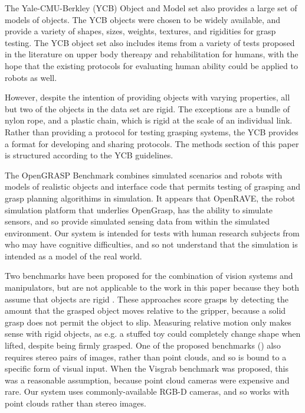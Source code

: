 \documentclass[letterpaper, 10 pt, conference]{ieeeconf}
\begin{document}
The Yale-CMU-Berkley (YCB) Object and Model set \cite{DBLP:journals/corr/CalliWSSAD15} also provides a large set of models of objects. 
The YCB objects were chosen to be widely available, and provide a variety of shapes, sizes, weights, textures, and rigidities for grasp testing. 
The YCB object set also includes items from a variety of tests proposed in the literature on upper body thereapy and rehabilitation for humans, with the hope that the existing protocols for evaluating human ability could be applied to robots as well. 

However, despite the intention of providing objects with varying properties, all but two of the objects in the data set are rigid. 
The exceptions are a bundle of nylon rope, and a plastic chain, which is rigid at the scale of an individual link. 
Rather than providing a protocol for testing grasping systems, the YCB provides a format for developing and sharing protocols. 
The methods section of this paper is structured according to the YCB guidelines. 

The OpenGRASP Benchmark \cite{ulbrich2011opengrasp} combines simulated scenarios and robots with models of realistic objects and interface code that permits testing of grasping and grasp planning algorithims in simulation. 
It appears that OpenRAVE, the robot simulation platform that underlies OpenGrasp, has the ability to simulate sensors, and so provide simulated sensing data from within the simulated environment.
Our system is intended for tests with human research subjects from who may have cognitive difficulties, and so not understand that the simulation is intended as a model of the real world. 

Two benchmarks have been proposed for the combination of vision systems and manipulators, but are not applicable to the work in this paper because they both assume that objects are rigid \cite{popovic2011grasping, kootstra2012visgrab}. 
These approaches score grasps by detecting the amount that the grasped object moves relative to the gripper, because a solid grasp does not permit the object to slip. 
Measuring relative motion only makes sense with rigid objects, as e.g. a stuffed toy could completely change shape when lifted, despite being firmly grasped.
One of the proposed benchmarks (\cite{kootstra2012visgrab}) also requires stereo pairs of images, rather than point clouds, and so is bound to a specific form of visual input. 
When the Visgrab benchmark was proposed, this was a reasonable assumption, because point cloud cameras were expensive and rare. 
Our system uses commonly-available RGB-D cameras, and so works with point clouds rather than stereo images. 
\end{document}
